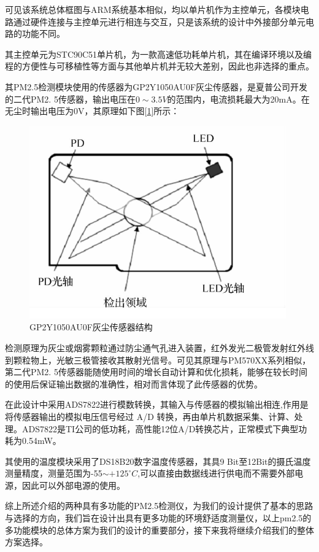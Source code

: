 \documentclass[a4paper, 11pt]{article} %
\begin{document}
\par{} 可见该系统总体框图与ARM系统基本相似，均以单片机作为主控单元，各模块电路通过硬件连接与主控单元进行相连与交互，只是该系统的设计中外接部分单元电路的功能不同。
\par{} 其主控单元为STC90C51单片机，为一款高速低功耗单片机，其在编译环境以及编程的方便性与可移植性等方面与其他单片机并无较大差别，因此也非选择的重点。
\par{} 其PM2.5检测模块使用的传感器为GP2Y1050AU0F灰尘传感器，是夏普公司开发的二代PM2. 5传感器\cite{cz2016yz}，输出电压在$0\sim 3.5V$的范围内，电流损耗最大为20mA。在无尘时输出电压为0V，其原理如下图[\ref{img5}]所示：
\begin{figure}[H]
  \centering
  \includegraphics[scale = 0.65 ]{1-5.png}
  \caption{GP2Y1050AU0F灰尘传感器结构}
  \label{img5} 
\end{figure}
\par{} 检测原理为灰尘或烟雾颗粒通过防尘通气孔进入装置，红外发光二极管发射红外线到颗粒物上，光敏三极管接收其散射光信号。可见其原理与PM570XX系列相似，第二代PM2. 5传感器能随使用时间的增长自动计算和优化损耗\cite{wl2016dgn}，能够在较长时间的使用后保证输出数据的准确性，相对而言体现了此传感器的优势。
\par{} 在此设计中采用ADS7822进行模数转换，其输入与传感器的模拟输出相连,作用是将传感器输出的模拟电压信号经过 A/D 转换，再由单片机数据采集、计算、处理。ADS7822是TI公司的低功耗，高性能12位A/D转换芯片，正常模式下典型功耗为0.54mW。
\par{} 其使用的温度模块采用了DS18B20数字温度传感器，其具9 Bit至12Bit的摄氏温度测量精度，测量范围为-55$\sim +125^{\circ}C$,可以直接由数据线进行供电而不需要外部电源，因此可以外部电源的使用。
\par{} 综上所述介绍的两种具有多功能的PM2.5检测仪，为我们的设计提供了基本的思路与选择的方向，我们旨在设计出具有更多功能的环境舒适度测量仪，以上pm2.5的多功能模块的总体方案为我们的设计的重要部分，接下来我将继续介绍我们的整体方案选择。
\end{document}
